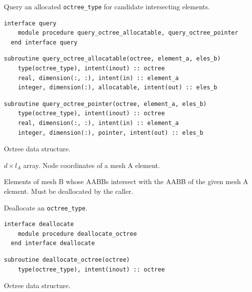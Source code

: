 \documentclass{article}
\begin{document}
\noindent Query an allocated \verb+octree_type+ for candidate intersecting
elements.
  
\begin{lstlisting}[language=FORTRAN]
  interface query
    module procedure query_octree_allocatable, query_octree_pointer
  end interface query
\end{lstlisting}
    
\begin{lstlisting}[language=FORTRAN]
  subroutine query_octree_allocatable(octree, element_a, eles_b)
    type(octree_type), intent(inout) :: octree
    real, dimension(:, :), intent(in) :: element_a
    integer, dimension(:), allocatable, intent(out) :: eles_b
\end{lstlisting}
  
\begin{lstlisting}[language=FORTRAN]
  subroutine query_octree_pointer(octree, element_a, eles_b)
    type(octree_type), intent(inout) :: octree
    real, dimension(:, :), intent(in) :: element_a
    integer, dimension(:), pointer, intent(out) :: eles_b
\end{lstlisting}

\begin{description}[font=\ttfamily\bfseries,leftmargin=2.2\parindent,labelindent=1.7\parindent,noitemsep]
  \item[octree] Octree data structure.
  \item[element\_a] $d \times l_A$ array. Node coordinates of a mesh A element.
  \item[eles\_b] Elements of mesh B whose AABBs intersect with the AABB of the
    given mesh A element. Must be deallocated by the caller.
\end{description}

\noindent Deallocate an \verb+octree_type+.
  
\begin{lstlisting}[language=FORTRAN]
  interface deallocate
    module procedure deallocate_octree
  end interface deallocate
\end{lstlisting}
  
\begin{lstlisting}[language=FORTRAN]
  subroutine deallocate_octree(octree)
    type(octree_type), intent(inout) :: octree
\end{lstlisting}

\begin{description}[font=\ttfamily\bfseries,leftmargin=2.2\parindent,labelindent=1.7\parindent,noitemsep]
  \item[octree] Octree data structure.
\end{description}
\end{document}
